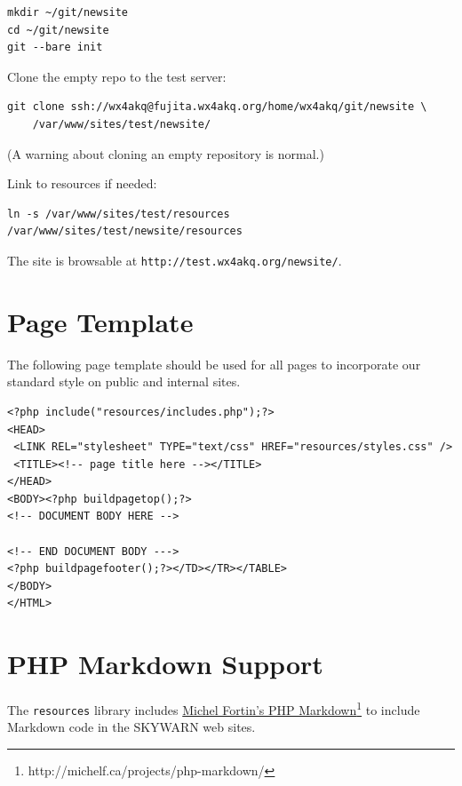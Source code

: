 \documentclass[pdflatex,letterpaper,twoside,12pt]{book}
\begin{document}
\begin{verbatim}
mkdir ~/git/newsite
cd ~/git/newsite
git --bare init
\end{verbatim}

Clone the empty repo to the test server:

\begin{verbatim}
git clone ssh://wx4akq@fujita.wx4akq.org/home/wx4akq/git/newsite \
	/var/www/sites/test/newsite/
\end{verbatim}

(A warning about cloning an empty repository is normal.)

Link to resources if needed:

\begin{verbatim}
ln -s /var/www/sites/test/resources /var/www/sites/test/newsite/resources
\end{verbatim}

The site is browsable at \texttt{http://test.wx4akq.org/newsite/}.


\section{Page Template}

The following page template should be used for all pages to incorporate our standard style on public and internal sites.
\pagebreak
\begin{verbatim}
<?php include("resources/includes.php");?>
<HEAD>
 <LINK REL="stylesheet" TYPE="text/css" HREF="resources/styles.css" />
 <TITLE><!-- page title here --></TITLE>
</HEAD>
<BODY><?php buildpagetop();?>
<!-- DOCUMENT BODY HERE -->

<!-- END DOCUMENT BODY --->
<?php buildpagefooter();?></TD></TR></TABLE>
</BODY>
</HTML>
\end{verbatim}


\section{PHP Markdown Support}

The \texttt{resources} library includes \href{http://michelf.ca/projects/php-markdown/}{Michel Fortin's PHP Markdown}\footnote{http://michelf.ca/projects/php-markdown/} to include Markdown code in the SKYWARN web sites.
\end{document}

